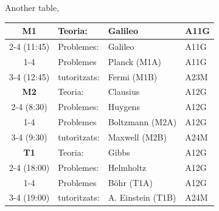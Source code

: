 \documentclass[twocolumn]{revtex4}
\begin{document}
\vspace*{0.5cm}
Another table,
\begin{center}
\begin{tabular}{||c||l|l|l||} \hline \hline
{\bf M1}      &    Teoria: & Galileo & A11G \\  \cline{2-4}
 (11:45)  &  Problemes: & Galileo  &  A11G \\  \cline{1-4}
          &  Problemes &  Planck (M1A) & A11G \\ \cline{3-4}
 (12:45)  &  tutoritzats: & Fermi (M1B)& A23M \\ 
\hline \hline
{\bf M2}  &    Teoria: & Clausius & A12G \\  \cline{2-4}
 (8:30)   &  Problemes: & Huygens  &  A12G \\  \cline{1-4}
          & Problemes &  Boltzmann (M2A) & A12G\\ \cline{3-4}
 (9:30)   & tutoritzats: & Maxwell (M2B) & A24M \\ 
\hline \hline
{\bf T1}      &    Teoria: & Gibbs & A12G \\  \cline{2-4}
 (18:00) &  Problemes: & Helmholtz &  A12G \\  \cline{1-4}
         &  Problemes &  B\"ohr (T1A) & A12G \\ \cline{3-4}
 (19:00) &  tutoritzats: &  A. Einstein (T1B) & A24M  \\ 
\hline \hline
\end{tabular}
\end{center}

\vspace*{0.5cm}
\end{document}
